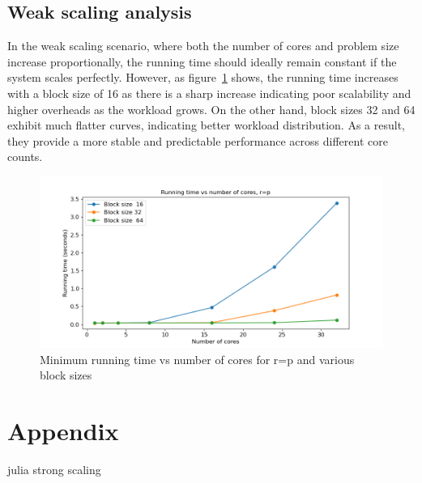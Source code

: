 \documentclass[a4paper,%
7pt,%
DIV12,
headsepline,%
headings=normal,
]{scrartcl}
\begin{document}
\subsection{Weak scaling analysis}

In the weak scaling scenario, where both the number of cores and problem size increase proportionally, the running time should ideally remain constant if the system scales perfectly. However, as figure~\ref{fig:weak_scaling_plot} shows, the running time increases with a block size of 16 as there is a sharp increase indicating poor scalability and higher overheads as the workload grows. On the other hand, block sizes 32 and 64 exhibit much flatter curves, indicating better workload distribution. As a result, they provide a more stable and predictable performance across different core counts. 

\begin{figure}[htbp]
    \centering
    \includegraphics[width=1\linewidth]{./weak_scaling_plot.png}
    \caption{Minimum running time vs number of cores for r=p and various block sizes}
    \label{fig:weak_scaling_plot}
\end{figure}

\newpage

\section*{Appendix}

\begin{table}[htbp]
\centering
{}
\caption{julia strong scaling}
\label{tab:anotherlabel}
\end{table}
\end{document}
